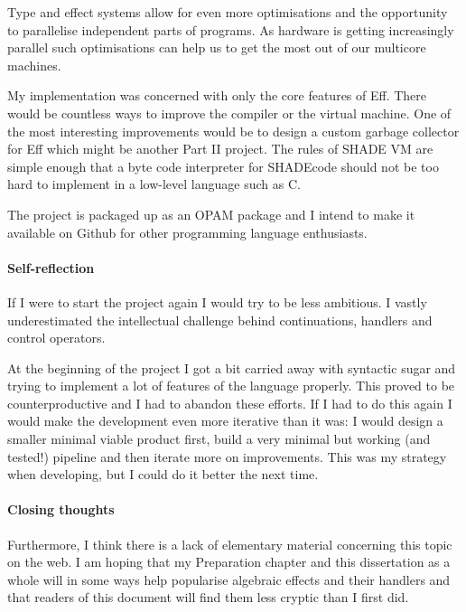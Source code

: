 \documentclass[class=article, crop=false]{standalone}
\begin{document}
Type and effect systems \cite{bauer2013effect} allow for even more optimisations
and the opportunity to parallelise independent parts of programs. As hardware is
getting increasingly parallel such optimisations can help us to get the most out
of our multicore machines.

My implementation was concerned with only the core features of Eff. There would
be countless ways to improve the compiler or the virtual machine. One of the
most interesting improvements would be to design a custom garbage collector for
Eff which might be another Part II project. The rules of SHADE VM are simple
enough that a byte code interpreter for SHADEcode should not be too hard to
implement in a low-level language such as C.

The project is packaged up as an OPAM package and I intend to make it available
on Github for other programming language enthusiasts.

\paragraph{Self-reflection}

If I were to start the project again I would try to be less ambitious. I vastly
underestimated the intellectual challenge behind continuations, handlers and
control operators.

At the beginning of the project I got a bit carried away with syntactic sugar
and trying to implement a lot of features of the language properly. This proved
to be counterproductive and I had to abandon these efforts. If I had to do this
again I would make the development even more iterative than it was: I would
design a smaller minimal viable product first, build a very minimal but working
(and tested!) pipeline and then iterate more on improvements. This was my
strategy when developing, but I could do it better the next time.

\paragraph{Closing thoughts}

Furthermore, I think there is a lack of elementary material concerning this
topic on the web. I am hoping that my Preparation chapter and this dissertation
as a whole will in some ways help popularise algebraic effects and their
handlers and that readers of this document will find them less cryptic than I
first did.
\end{document}
